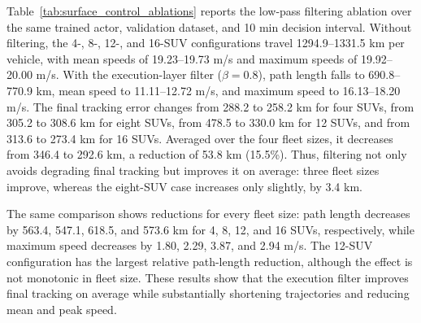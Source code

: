 \documentclass[a4paper,fleqn]{cas-dc}
\begin{document}
Table~\ref{tab:surface_control_ablations} reports the low-pass filtering
ablation over the same trained actor, validation dataset, and 10 min
decision interval. Without filtering, the 4-, 8-, 12-, and 16-SUV
configurations travel 1294.9--1331.5 km per vehicle, with mean speeds of
19.23--19.73 m/s and maximum speeds of 19.92--20.00 m/s. With the
execution-layer filter ($\beta=0.8$), path length falls to 690.8--770.9 km,
mean speed to 11.11--12.72 m/s, and maximum speed to 16.13--18.20 m/s.
The final tracking error changes from 288.2 to 258.2 km for four SUVs, from
305.2 to 308.6 km for eight SUVs, from 478.5 to 330.0 km for 12 SUVs, and from
313.6 to 273.4 km for 16 SUVs. Averaged over the four fleet sizes, it decreases
from 346.4 to 292.6 km, a reduction of 53.8 km
(15.5\%). Thus, filtering not only avoids degrading final tracking but improves
it on average: three fleet sizes improve, whereas the eight-SUV case increases
only slightly, by 3.4 km.

The same comparison shows reductions for every fleet size: path length
decreases by 563.4, 547.1, 618.5, and 573.6 km for 4, 8, 12, and 16 SUVs,
respectively, while maximum speed decreases by 1.80, 2.29, 3.87, and 2.94 m/s.
The 12-SUV configuration has the largest relative path-length reduction,
although the effect is not monotonic in fleet size. These results show that the
execution filter improves final tracking on average while substantially
shortening trajectories and reducing mean and peak speed.
\end{document}
